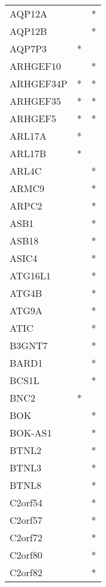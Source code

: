 \begin{longtable}{lcc}
AQP12A         &           &       * \\
AQP12B         &           &       * \\
AQP7P3         &         * &         \\
ARHGEF10       &           &       * \\
ARHGEF34P      &         * &       * \\
ARHGEF35       &         * &       * \\
ARHGEF5        &         * &       * \\
ARL17A         &         * &         \\
ARL17B         &         * &         \\
ARL4C          &           &       * \\
ARMC9          &           &       * \\
ARPC2          &           &       * \\
ASB1           &           &       * \\
ASB18          &           &       * \\
ASIC4          &           &       * \\
ATG16L1        &           &       * \\
ATG4B          &           &       * \\
ATG9A          &           &       * \\
ATIC           &           &       * \\
B3GNT7         &           &       * \\
BARD1          &           &       * \\
BCS1L          &           &       * \\
BNC2           &         * &         \\
BOK            &           &       * \\
BOK-AS1        &           &       * \\
BTNL2          &           &       * \\
BTNL3          &           &       * \\
BTNL8          &           &       * \\
C2orf54        &           &       * \\
C2orf57        &           &       * \\
C2orf72        &           &       * \\
C2orf80        &           &       * \\
C2orf82        &           &       * \\

\end{longtable}
